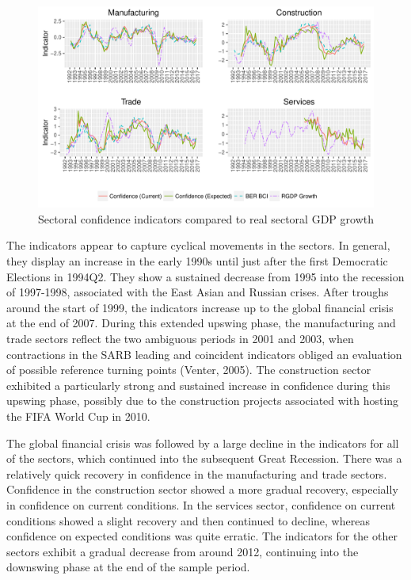 \documentclass[11pt,]{article}
\begin{document}
\begin{figure}
\centering
\includegraphics{BCon_5_Journal_files/figure-latex/figure11-1.pdf}
\caption{Sectoral confidence indicators compared to real sectoral GDP
growth}
\end{figure}

The indicators appear to capture cyclical movements in the sectors. In
general, they display an increase in the early 1990s until just after
the first Democratic Elections in 1994Q2. They show a sustained decrease
from 1995 into the recession of 1997-1998, associated with the East
Asian and Russian crises. After troughs around the start of 1999, the
indicators increase up to the global financial crisis at the end of
2007. During this extended upswing phase, the manufacturing and trade
sectors reflect the two ambiguous periods in 2001 and 2003, when
contractions in the SARB leading and coincident indicators obliged an
evaluation of possible reference turning points (Venter, 2005). The
construction sector exhibited a particularly strong and sustained
increase in confidence during this upswing phase, possibly due to the
construction projects associated with hosting the FIFA World Cup in
2010.

The global financial crisis was followed by a large decline in the
indicators for all of the sectors, which continued into the subsequent
Great Recession. There was a relatively quick recovery in confidence in
the manufacturing and trade sectors. Confidence in the construction
sector showed a more gradual recovery, especially in confidence on
current conditions. In the services sector, confidence on current
conditions showed a slight recovery and then continued to decline,
whereas confidence on expected conditions was quite erratic. The
indicators for the other sectors exhibit a gradual decrease from around
2012, continuing into the downswing phase at the end of the sample
period.
\end{document}
